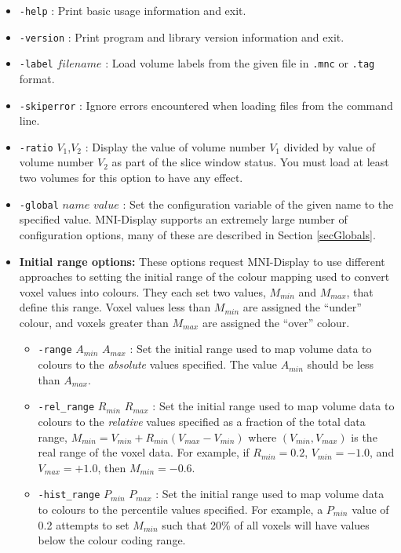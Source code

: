\documentclass[11pt,letterpaper]{article}
\newcommand{\ident}[1]{{\tt #1}}
\newcommand{\display}{\mbox{MNI-Display}}
\begin{document}
\begin{itemize}
\item \ident{-help} : Print basic usage information and exit.
\item \ident{-version} : Print program and library version information and exit.
\item \ident{-label} $filename$ : Load volume labels from the given file in \ident{.mnc} or \ident{.tag} format.
\item \ident{-skiperror} : Ignore errors encountered when loading files from the command line.
\item \ident{-ratio} $V_1$,$V_2$ : Display the value of volume number $V_1$
  divided by value of volume number $V_2$ as part of the slice window status. You must load at least two
  volumes for this option to have any effect.
\item \ident{-global} $name$ $value$ : Set the configuration variable of the given name to the specified value. \display{} supports an extremely large number of configuration options, many of these are described in Section \ref{secGlobals}.
\item {\bf Initial range options:} These options request \display{} to
  use different approaches to setting the initial range of the colour
  mapping used to convert voxel values into colours. They each set two
  values, $M_{min}$ and $M_{max}$, that define this range. Voxel values
  less than $M_{min}$ are assigned the ``under'' colour, and voxels
  greater than $M_{max}$ are assigned the ``over'' colour.
\begin{itemize}
\item \ident{-range} $A_{min}$ $A_{max}$ : Set the initial range used to
  map volume data to colours to the {\em absolute} values specified. The
  value $A_{min}$ should be less than $A_{max}$.
\item \ident{-rel\_range} $R_{min}$ $R_{max}$ : Set the initial range used to
  map volume data to colours to the {\em relative} values specified as a
  fraction of the total data range, $M_{min} = V_{min} + R_{min}
  (V_{max} - V_{min})$ where $(V_{min},V_{max})$ is the real range of
  the voxel data. For example, if $R_{min}=0.2$, $V_{min}=-1.0$, and 
  $V_{max}=+1.0$, then $M_{min}=-0.6$.
\item \ident{-hist\_range} $P_{min}$ $P_{max}$ : Set the initial range used to
  map volume data to colours to the percentile values specified. For
  example, a $P_{min}$ value of 0.2 attempts to set $M_{min}$ such that
  20\% of all voxels will have values below the colour coding range.

\end{itemize}
\end{itemize}
\end{document}

